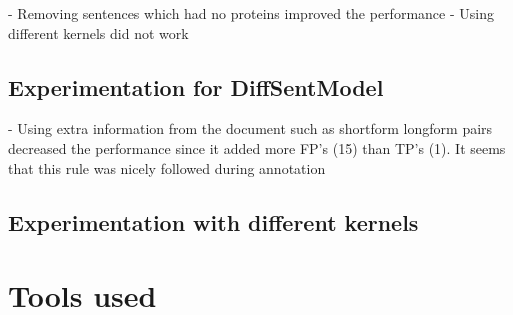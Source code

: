 - Removing sentences which had no proteins improved the performance
- Using different kernels did not work

\subsection{Experimentation for DiffSentModel}

- Using extra information from the document such as shortform longform pairs decreased the performance since it added more FP's (15) than TP's (1). It seems that this rule was nicely followed during annotation

\subsection{Experimentation with different kernels}

\section{Tools used}
